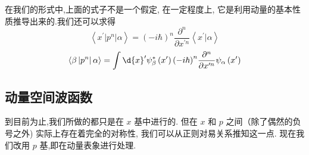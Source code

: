 在我们的形式中,上面的式子不是一个假定, 在一定程度上, 它是利用动量的基本性质推导出来的.我们还可以求得
\begin{equation}
	\left\langle {{x}^{\prime }\left| {p}^{n}\right| \alpha }\right\rangle = {\left( -i\hbar \right) }^{n}\frac{{\partial }^{n}}{\partial {x}^{\prime n}}\left\langle {{x}^{\prime } | \alpha }\right\rangle
\end{equation}
\begin{equation}
	\left\langle {\beta \left| {p}^{n}\right| \alpha }\right\rangle = \int \d{x}^{\prime }{\psi }_{\beta }^{ * }\left( {x}^{\prime }\right) {\left( -i\hbar \right) }^{n}\frac{{\partial }^{n}}{\partial {x}^{\prime n}}{\psi }_{\alpha }\left( {x}^{\prime }\right)
\end{equation}
\subsection{动量空间波函数}
到目前为止,我们所做的都只是在 $x$ 基中进行的. 但在 $x$ 和 $p$ 之间（除了偶然的负号之外) 实际上存在着完全的对称性, 我们可以从正则对易关系推知这一点. 现在我们改用 $p$ 基,即在动量表象进行处理.

